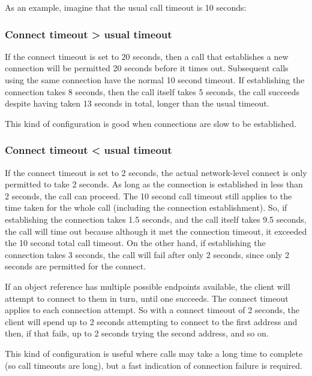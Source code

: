 \documentclass[11pt,twoside,a4paper]{book}
\begin{document}
\vspace{\baselineskip}\noindent
As an example, imagine that the usual call timeout is 10 seconds:

\subsubsection*{Connect timeout > usual timeout}

If the connect timeout is set to 20 seconds, then a call that
establishes a new connection will be permitted 20 seconds before it
times out. Subsequent calls using the same connection have the normal
10 second timeout. If establishing the connection takes 8 seconds,
then the call itself takes 5 seconds, the call succeeds despite having
taken 13 seconds in total, longer than the usual timeout.

This kind of configuration is good when connections are slow to be
established.

\subsubsection*{Connect timeout < usual timeout}

If the connect timeout is set to 2 seconds, the actual network-level
connect is only permitted to take 2 seconds. As long as the connection
is established in less than 2 seconds, the call can proceed. The 10
second call timeout still applies to the time taken for the whole call
(including the connection establishment). So, if establishing the
connection takes 1.5 seconds, and the call itself takes 9.5 seconds,
the call will time out because although it met the connection timeout,
it exceeded the 10 second total call timeout. On the other hand, if
establishing the connection takes 3 seconds, the call will fail after
only 2 seconds, since only 2 seconds are permitted for the connect.

If an object reference has multiple possible endpoints available, the
client will attempt to connect to them in turn, until one succeeds.
The connect timeout applies to each connection attempt. So with a
connect timeout of 2 seconds, the client will spend up to 2 seconds
attempting to connect to the first address and then, if that fails, up
to 2 seconds trying the second address, and so on.

This kind of configuration is useful where calls may take a long time
to complete (so call timeouts are long), but a fast indication of
connection failure is required.
\end{document}
